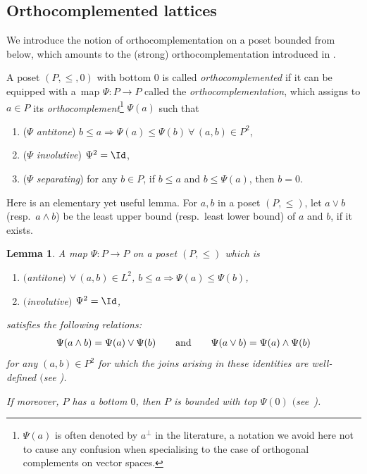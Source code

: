 \documentclass[10pt,a4paper]{amsart}
\numberwithin{equation}{section}
\newtheorem{Lemma}[Theorem]{Lemma}
\newcommand{\pone}{separating\xspace }
\begin{document}
\subsection{ Orthocomplemented lattices}
We introduce the notion of orthocomplementation on a poset bounded from below, which amounts to the (strong) orthocomplementation introduced in \cite[Remark below Proposition~1.7]{CM}.

\begin{Definition} \label{defn:orthocomplementmap}
A poset $(P, \leq, 0)$ with bottom $0$ is called {\it orthocomplemented} if it can be equipped with a~map $\Psi\colon P\to P$ called the {\it orthocomplementation}, which assigns to $a\in P$ its {\it orthocomplement}\footnote{$\Psi(a)$ is often denoted by $a^\perp$ in the literature, a notation we avoid here not to cause any confusion when specialising to the case of orthogonal complements on vector spaces.} $\Psi(a)$ such that
\begin{enumerate}\itemsep=0pt
\item[$(a)$] ({\it $\Psi$ antitone})
 $b\leq a\Rightarrow\Psi(a)\leq \Psi(b)\ \forall\, (a, b)\in P^2$,
\item[$(b)$]
({\it $\Psi$ involutive})
$\Psi^2=\Id$,
\item[$(c)$] ({\it $\Psi$ \pone })
for any $b\in P$, if $b\leq a$ and $b\leq \Psi(a)$, then $b=0$.
\end{enumerate}
\end{Definition}
Here is an elementary yet useful lemma.
For $a, b$ in a poset $(P,\leq)$, let $a\vee b$ (resp.~$a\wedge b$) be the least upper bound (resp.~least lower bound) of $a$ and $b$, if it exists.

\begin{Lemma} %
A map $\Psi\colon P\to P$ on a poset $(P, \leq)$ which is
\begin{enumerate}\itemsep=0pt
\item[$(a)$] $(${\it antitone}$)$
			$\forall\, (a, b)\in L^2$, $b\leq a\Rightarrow\Psi(a)\leq \Psi(b)$,
\item[$(b)$]
			$(${\it involutive}$)$
			$\Psi^2=\Id$,
\end{enumerate}
		satisfies the following relations:
		\begin{gather*}%
		\Psi(a \wedge b)=\Psi(a)\vee\Psi(b)\qquad {\rm and}\qquad \Psi(a \vee b)=\Psi(a )\wedge\Psi(b) \end{gather*}
for any $(a , b)\in P^2$ for which the joins arising in these identities are well-defined $($see {\rm\cite[Proposition~1.3(iii)]{CM})}.
		
		If moreover, $P$ has a bottom $0$, then $P$ is bounded with top $\Psi(0)$
		$($see~{\rm\cite[Proposition~1.3(iii)]{CM})}.
\end{Lemma}
\end{document}
